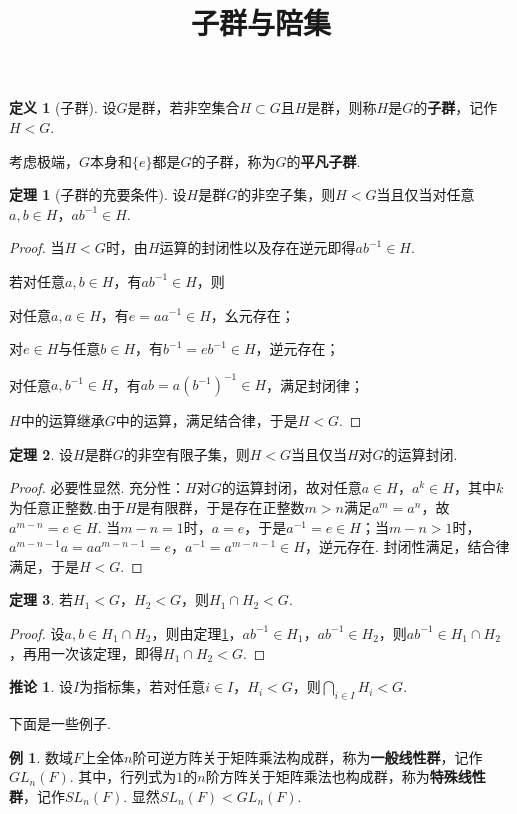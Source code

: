 \documentclass[12pt]{ctexart}
\title{\vspace{-2em}\textbf{子群与陪集}\vspace{-2em}}
\date{ }
\theoremstyle{definition}
\newtheorem{definition}{定义}
\newtheorem{theorem}{定理}
\newtheorem{corollary}{推论}
\newtheorem{example}{例}
\theoremstyle{plain}
\begin{document}
	\maketitle
	\begin{definition}[子群]
		设$G$是群，若非空集合$H\subset G$且$H$是群，则称$H$是$G$的\textbf{子群}，记作$H<G$.
	\end{definition}
	考虑极端，$G$本身和$\{e\}$都是$G$的子群，称为$G$的\textbf{平凡子群}.
	\begin{theorem}[子群的充要条件]\label{iff}
		设$H$是群$G$的非空子集，则$H<G$当且仅当对任意$a,b\in H$，$ab^{-1}\in H$.
	\end{theorem}
	\begin{proof}
		当$H<G$时，由$H$运算的封闭性以及存在逆元即得$ab^{-1}\in H$.
		
		若对任意$a,b\in H$，有$ab^{-1}\in H$，则
		
		对任意$a,a\in H$，有$e=aa^{-1}\in H$，幺元存在；
		
		对$e\in H$与任意$b\in H$，有$b^{-1}=eb^{-1}\in H$，逆元存在；
		
		对任意$a,b^{-1}\in H$，有$ab=a(b^{-1})^{-1}\in H$，满足封闭律；
		
		$H$中的运算继承$G$中的运算，满足结合律，于是$H<G$.
	\end{proof}
	\begin{theorem}
		设$H$是群$G$的非空有限子集，则$H<G$当且仅当$H$对$G$的运算封闭.
	\end{theorem}
	\begin{proof}
		必要性显然. 充分性：$H$对$G$的运算封闭，故对任意$a\in H$，$a^k\in H$，其中$k$为任意正整数.由于$H$是有限群，于是存在正整数$m>n$满足$a^m=a^n$，故$a^{m-n}=e\in H$. 当$m-n=1$时，$a=e$，于是$a^{-1}=e\in H$；当$m-n>1$时，$a^{m-n-1}a=aa^{m-n-1}=e$，$a^{-1}=a^{m-n-1}\in H$，逆元存在. 封闭性满足，结合律满足，于是$H<G$.
	\end{proof}
	\begin{theorem}
		若$H_1<G$，$H_2<G$，则$H_1\cap H_2<G$.
	\end{theorem}
	\begin{proof}
		设$a,b\in H_1\cap H_2$，则由定理\ref{iff}，$ab^{-1}\in H_1$，$ab^{-1}\in H_2$，则$ab^{-1}\in H_1\cap H_2$，再用一次该定理，即得$H_1\cap H_2<G$.
	\end{proof}
	\begin{corollary}
		设$I$为指标集，若对任意$i\in I$，$H_i<G$，则$\bigcap_{i\in I}H_i<G$.
	\end{corollary}
	下面是一些例子.
	\begin{example}
		数域$F$上全体$n$阶可逆方阵关于矩阵乘法构成群，称为\textbf{一般线性群}，记作$GL_n(F)$. 其中，行列式为$1$的$n$阶方阵关于矩阵乘法也构成群，称为\textbf{特殊线性群}，记作$SL_n(F)$. 显然$SL_n(F)<GL_n(F)$.
	\end{example}
\end{document}
